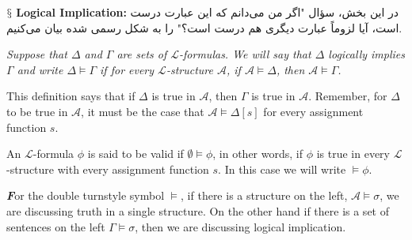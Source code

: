 \documentclass[10pt,a4paper]{article}
\newenvironment{callout}
	{\begin{calloutbox}\color{charcoal}\textbf\textit}
	{\end{calloutbox}}
\newcommand{\newpoint}[1]{\indent$\mathsection$ \textbf{#1}}
\newcommand{\curveL}{\mathcal{L}}
\newcommand{\curveA}{\mathcal{A}}
\begin{document}
                    \newpoint{Logical Implication: }در این بخش، سؤال "اگر من می‌دانم که این عبارت درست است، آیا لزوماً عبارت دیگری هم درست است؟" را به شکل رسمی شده بیان می‌کنیم.
                    \begin{define}
                        \textit{Suppose that $\Delta$ and $\Gamma$ are sets of $\curveL$-formulas. We will say that $\Delta$ logically implies $\Gamma$ and write $\Delta\vDash \Gamma$ if for every $\curveL$-structure $\curveA$, if $\curveA\vDash\Delta$, then $\curveA\vDash\Gamma$.}
                    \end{define}
                    This definition says that if $\Delta$ is true in $\curveA$, then $\Gamma$ is true in $\curveA$. Remember, for $\Delta$ to be true in $\curveA$, it must be the case that $\curveA\vDash\Delta[s]$ for every assignment function $s$.
                    \begin{define}
                        An $\curveL$-formula $\phi$ is said to be valid if $\emptyset\vDash\phi$, in other words, if $\phi$ is true in every $\curveL$-structure with every assignment function $s$. In this case we will write $\vDash\phi$.
                    \end{define}
                    \begin{callout}
                        For the double turnstyle symbol $\vDash$, if there is a structure on the left, $\curveA\vDash \sigma$, we are discussing truth in a single structure. On the other hand if there is a set of sentences on the left $\Gamma\vDash\sigma$, then we are discussing logical implication.
                    \end{callout}
\end{document}
